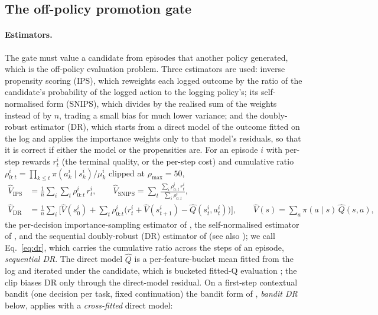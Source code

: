\documentclass[10pt]{article}
\begin{document}
\subsection{The off-policy promotion gate}
\label{sec:gate}

\paragraph{Estimators.} The gate must value a candidate from episodes that another policy generated, which is the off-policy evaluation problem. Three estimators are used: inverse propensity scoring (IPS), which reweights each logged outcome by the ratio of the candidate's probability of the logged action to the logging policy's; its self-normalised form (SNIPS), which divides by the realised sum of the weights instead of by $n$, trading a small bias for much lower variance; and the doubly-robust estimator (DR), which starts from a direct model of the outcome fitted on the log and applies the importance weights only to that model's residuals, so that it is correct if either the model or the propensities are. For an episode $i$ with per-step rewards $r^i_t$ (the terminal quality, or the per-step cost) and cumulative ratio $\rho^i_{0:t}=\prod_{k\le t}\pi(a^i_k\mid s^i_k)/\mu^i_k$ clipped at $\rho_{\max}=50$,
\begin{align}
\hat V_{\mathrm{IPS}}&=\frac1n\sum_i\sum_t\rho^i_{0:t}\,r^i_t, \qquad
\hat V_{\mathrm{SNIPS}}=\sum_t\frac{\sum_i\rho^i_{0:t}\,r^i_t}{\sum_i\rho^i_{0:t}},
\label{eq:ips}\\
\hat V_{\mathrm{DR}}&=\frac1n\sum_i\Big[\hat V(s^i_0)+\sum_t\rho^i_{0:t}\big(r^i_t+\hat V(s^i_{t+1})-\hat Q(s^i_t,a^i_t)\big)\Big],\qquad
\hat V(s)=\sum_a\pi(a\mid s)\,\hat Q(s,a),
\label{eq:dr}
\end{align}
the per-decision importance-sampling estimator of \citet{precup2000eligibility}, the self-normalised estimator of \citet{swaminathan2015snips}, and the sequential doubly-robust (DR) estimator of \citet{jiang2016dr} (see also \citealp{thomas2016magic}); we call Eq.~\eqref{eq:dr}, which carries the cumulative ratio across the steps of an episode, \emph{sequential DR}. The direct model $\hat Q$ is a per-feature-bucket mean fitted from the log and iterated under the candidate, which is bucketed fitted-Q evaluation \citep{le2019batch}; the clip biases DR only through the direct-model residual. On a first-step contextual bandit (one decision per task, fixed continuation) the bandit form of \citet{dudik2011dr}, \emph{bandit DR} below, applies with a \emph{cross-fitted} direct model:
\end{document}
